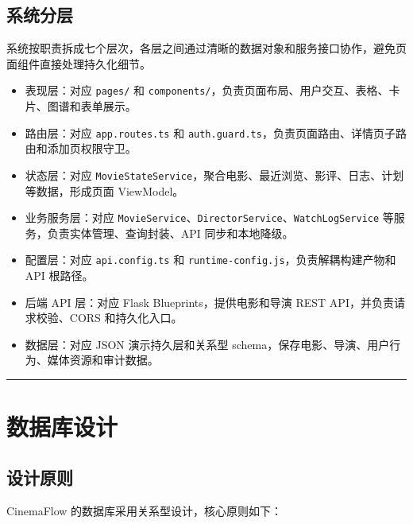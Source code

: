\documentclass[
]{ctexart}
\providecommand{\tightlist}{%
  \setlength{\itemsep}{0pt}\setlength{\parskip}{0pt}}
\begin{document}
\hypertarget{ux7cfbux7edfux5206ux5c42}{%
\subsection{系统分层}\label{ux7cfbux7edfux5206ux5c42}}

系统按职责拆成七个层次，各层之间通过清晰的数据对象和服务接口协作，避免页面组件直接处理持久化细节。

\begin{itemize}
\tightlist
\item
  表现层：对应 \texttt{pages/} 和
  \texttt{components/}，负责页面布局、用户交互、表格、卡片、图谱和表单展示。
\item
  路由层：对应 \texttt{app.routes.ts} 和
  \texttt{auth.guard.ts}，负责页面路由、详情页子路由和添加页权限守卫。
\item
  状态层：对应
  \texttt{MovieStateService}，聚合电影、最近浏览、影评、日志、计划等数据，形成页面
  ViewModel。
\item
  业务服务层：对应
  \texttt{MovieService}、\texttt{DirectorService}、\texttt{WatchLogService}
  等服务，负责实体管理、查询封装、API 同步和本地降级。
\item
  配置层：对应 \texttt{api.config.ts} 和
  \texttt{runtime-config.js}，负责解耦构建产物和 API 根路径。
\item
  后端 API 层：对应 Flask Blueprints，提供电影和导演 REST
  API，并负责请求校验、CORS 和持久化入口。
\item
  数据层：对应 JSON 演示持久层和关系型
  schema，保存电影、导演、用户行为、媒体资源和审计数据。
\end{itemize}

\begin{center}\rule{0.5\linewidth}{0.5pt}\end{center}

\hypertarget{ux6570ux636eux5e93ux8bbeux8ba1}{%
\section{数据库设计}\label{ux6570ux636eux5e93ux8bbeux8ba1}}

\hypertarget{ux8bbeux8ba1ux539fux5219}{%
\subsection{设计原则}\label{ux8bbeux8ba1ux539fux5219}}

CinemaFlow 的数据库采用关系型设计，核心原则如下：
\end{document}
